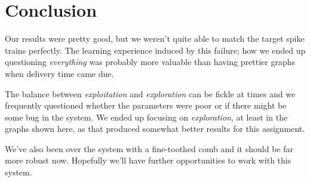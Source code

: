 \documentclass[a4paper]{article}
\begin{document}
\section{Conclusion}
\label{sec:conclusion}

Our results were pretty good, but we weren't quite able to match the target spike trains perfectly. The learning experience induced by this failure; how we ended up questioning \emph{everything} was probably more valuable than having prettier graphs when delivery time came due.

The balance between \textit{exploitation} and \textit{exploration} can be fickle at times and we frequently questioned whether the parameters were poor or if there might be some bug in the system. We ended up focusing on \textit{exploration}, at least in the graphs shown here, as that produced somewhat better results for this assignment.

We've also been over the system with a fine-toothed comb and it should be far more robust now. Hopefully we'll have further opportunities to work with this system.
\end{document}
